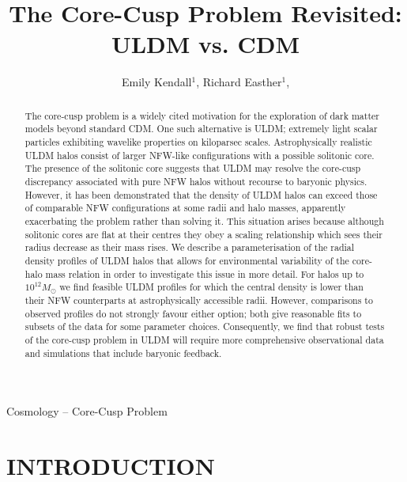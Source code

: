 \documentclass{pasa}%
\title[The Core-Cusp Problem Revisited: ULDM vs. CDM]{The Core-Cusp Problem Revisited: ULDM vs. CDM}
\author[Emily Kendall and Richard Easther]{Emily Kendall$^1$, Richard Easther$^1$, \affil{$^1$Department of Physics, University of Auckland, Private Bag 92019, Auckland, New Zealand}}%
\begin{document}
\begin{frontmatter}
\maketitle

\begin{abstract}
The core-cusp problem is a widely cited motivation for the exploration of dark matter models beyond standard CDM. One such alternative is ULDM; extremely light scalar particles exhibiting wavelike properties on kiloparsec scales.  Astrophysically realistic ULDM halos consist of larger NFW-like configurations with a possible solitonic core. The presence of the solitonic core suggests that ULDM may resolve the core-cusp discrepancy associated with pure NFW halos without recourse to baryonic physics. However, it has been demonstrated that the density of ULDM halos can exceed those of comparable NFW configurations at some radii and halo masses, apparently exacerbating the problem rather than solving it. This situation arises because although solitonic cores are flat at their centres they obey a scaling relationship which sees their radius decrease as their mass rises. We describe a parameterisation of the radial density profiles of ULDM halos that allows for environmental variability of the core-halo mass relation in order to investigate this issue in more detail.  For halos up to $10^{12} M_\odot$ we find feasible ULDM profiles for which the central density is lower than their NFW counterparts at astrophysically accessible radii. However, comparisons to observed profiles do not strongly favour either option; both give reasonable fits to subsets of the data for some parameter choices. Consequently, we find that robust tests of the core-cusp problem in ULDM will require more comprehensive observational data and simulations that include baryonic feedback. 

\end{abstract}

\begin{keywords}
Cosmology -- Core-Cusp Problem 
\end{keywords}
\end{frontmatter}


\section{INTRODUCTION }
\label{sec:intro}
\end{document}

